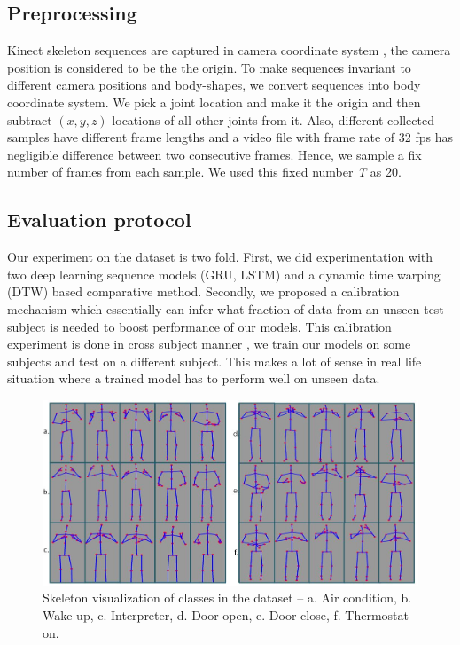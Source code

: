 \documentclass[10pt,twocolumn,letterpaper]{article}
\begin{document}
\subsection{Preprocessing}
Kinect skeleton sequences are 
captured in camera coordinate system \ie, the 
camera position is considered to be the
the origin. To make sequences invariant to different 
camera positions and body-shapes, we convert sequences 
into body coordinate system. We pick a joint location 
and make it the 
origin and then  subtract $(x, y, z)$ locations of all
other joints from it. Also, different collected samples have
different frame lengths and a video file with frame rate of 32 fps has negligible difference between two consecutive frames. Hence, we sample 
a fix number of frames from each sample. We used this fixed number \textit{T} as  20. 



\subsection{Evaluation protocol}
\label{sec:ev_prot}
Our experiment on the dataset is two fold. First, we did experimentation 
with two deep learning sequence models (GRU, LSTM)  and a dynamic time warping (DTW) based comparative method. Secondly, we proposed a calibration mechanism which essentially can infer what fraction of data from an unseen test subject is needed to boost performance of our models. This calibration experiment is done in cross subject manner \eg, we train our models on some subjects and test on a different subject. This makes a lot of sense in real life situation where a trained model has to perform well on unseen data. 



\begin{figure}
	\begin{center}
		\includegraphics[width=.8\linewidth]{sk_data_viz}
	\end{center}
	\caption{Skeleton visualization of classes in the dataset -- a. Air condition, b. Wake up, c. Interpreter, d. Door open, e. Door close, f. Thermostat on.}
	\label{fig:sk_dat_viz}
\end{figure}
\end{document}
